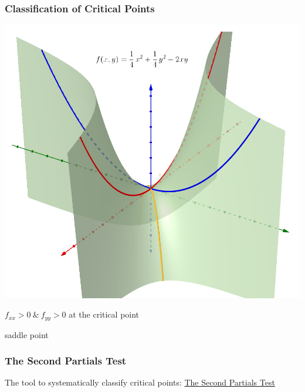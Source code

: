 \documentclass[10pt]{beamer}
\begin{document}
\begin{frame}
\frametitle{Classification of Critical Points}
\centering
\includegraphics[width=.65\textwidth]{saddlepoint.png}

$f_{xx} >0\ \&\ f_{yy} > 0$ at the critical point

saddle point
\end{frame}

\begin{frame}
\frametitle{The Second Partials Test}
The tool to systematically classify critical points:
\href{https://ng.cengage.com/static/nb/ui/evo/index.html?eISBN=9780357749340&id=1514756126&snapshotId=2988231&}{The Second Partials Test}
\end{frame}
\end{document}

